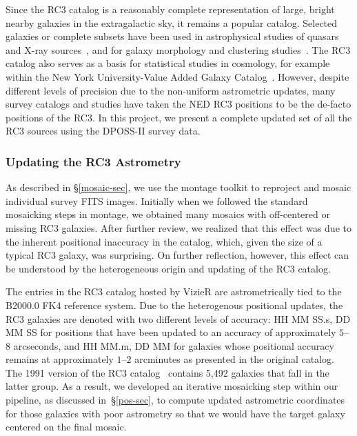 \documentclass[authoryear, 12pt, 5p, times]{elsarticle}
\begin{document}
Since the RC3 catalog  is a reasonably complete representation of large, bright nearby galaxies in the extragalactic sky, it remains a popular catalog. Selected galaxies or complete subsets have been used in astrophysical studies of quasars and X-ray sources~\citep[e.g.,][]{walton-rc3}, and for galaxy morphology and clustering studies~\citep[e.g.,][]{best-rc3, knapen-rc3}.  The RC3 catalog also serves as a basis for statistical studies  in cosmology, for example within the New York University-Value Added Galaxy Catalog~\citep{nyuvagc}. However, despite different levels of precision due to the non-uniform astrometric updates, many survey catalogs and studies have taken the NED RC3 positions to be the de-facto positions of the RC3. In this project, we present a complete updated set of all the RC3 sources using the  DPOSS-II survey data. 

\subsubsection{Updating the RC3 Astrometry\label{sec:position}}

As described in \S\ref{mosaic-sec}, we use the montage toolkit to reproject and mosaic individual survey FITS images. Initially when we followed the standard mosaicking steps in montage, we obtained many mosaics with off-centered or missing RC3 galaxies. After further review, we realized that this effect was due to the inherent positional inaccuracy in the catalog, which, given the size of a typical RC3 galaxy, was surprising. On further reflection, however, this effect can be understood by the heterogeneous origin and updating of the RC3 catalog.

The entries in the RC3 catalog hosted by VizieR are astrometrically tied to the B2000.0 FK4 reference system. Due to the heterogenous positional updates, the RC3 galaxies are denoted with two different levels of accuracy: HH MM SS.s, DD MM SS for positions that have been updated  to an accuracy of approximately $5$--$8$ arcseconds, and  HH MM.m, DD MM for galaxies whose positional accuracy remains at approximately $1$--$2$ arcminutes as presented in the original catalog. The 1991 version of the RC3 catalog~\citep{rc31991} contains 5,492  galaxies that fall in the latter group. As a result, we developed an iterative mosaicking step within our pipeline, as discussed in~\S\ref{pos-sec}, to compute updated astrometric coordinates for those galaxies with poor astrometry so that we would have the target galaxy centered on the final mosaic.
\end{document}
